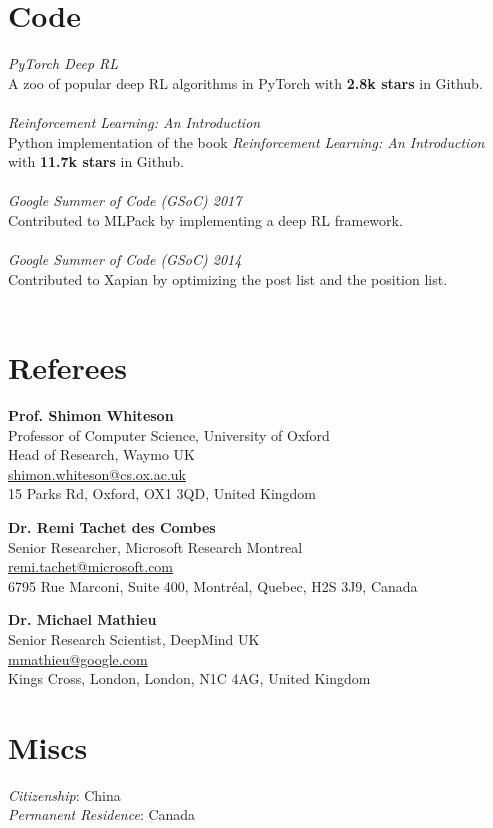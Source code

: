 \documentclass[margin, 10pt]{res} %
\newcommand*{\code}[2]{{{\sl #1} \\ #2 \\\\}}
\begin{document}
\begin{resume}
\section{Code}
\code{PyTorch Deep RL}{A zoo of popular deep RL algorithms in PyTorch with \textbf{2.8k stars} in Github.}
\code{{Reinforcement Learning: An Introduction}}{Python implementation of the book \textit{Reinforcement Learning: An Introduction} \\ with \textbf{11.7k stars} in Github.}
\code{{Google Summer of Code (GSoC) 2017}}{Contributed to MLPack by implementing a deep RL framework.}
\code{{Google Summer of Code (GSoC) 2014}}{Contributed to Xapian by optimizing the post list and the position list.}



\ifdefined{}
\section{Referees}

\textbf{Prof. Shimon Whiteson} \\
Professor of Computer Science, University of Oxford \\
Head of Research, Waymo UK \\
\href{mailto:shimon.whiteson@cs.ox.ac.uk}{shimon.whiteson@cs.ox.ac.uk} \\
15 Parks Rd, Oxford, OX1 3QD, United Kingdom

\textbf{Dr. Remi Tachet des Combes} \\
Senior Researcher, Microsoft Research Montreal \\
\href{mailto:remi.tachet@microsoft.com}{remi.tachet@microsoft.com} \\
6795 Rue Marconi, Suite 400, Montréal, Quebec, H2S 3J9, Canada

\textbf{Dr. Michael Mathieu} \\
Senior Research Scientist, DeepMind UK \\
\href{mailto:mmathieu@google.com}{mmathieu@google.com} \\
Kings Cross, London, London, N1C 4AG, United Kingdom
\fi

\ifdefined\misc
\section{Miscs}
{\sl Citizenship}: China \\
{\sl Permanent Residence}: Canada \\
\fi
\end{resume}
\end{document}
